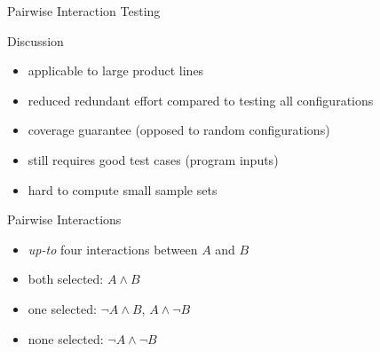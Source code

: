 \begin{frame}{\myframetitle}
\begin{mycolumns}
\begin{definition}{Pairwise Interaction Testing}
\begin{itemize}
			\end{itemize}
		\end{definition}
	\mynextcolumn
		\pause
		\begin{note}{Discussion}
			\begin{itemize}
				\setlength\itemsep{.4em}
				\item applicable to large product lines
				\item reduced redundant effort compared to testing all configurations
				\item coverage guarantee (opposed to random configurations)
				\item still requires good test cases (program inputs)
				\item hard to compute small sample sets
			\end{itemize}
		\end{note}
		\pause
		\begin{definition}{Pairwise Interactions}
			\begin{itemize}
				\setlength\itemsep{.5em}
				\item \emph{up-to} four interactions between $A$ and $B$
				\item both selected: $A \wedge B$
				\item one selected: $\neg A \wedge B$, $A \wedge \neg B$
				\item none selected: $\neg A \wedge \neg B$
			\end{itemize}
		\end{definition}
	\end{mycolumns}
\end{frame}

\newcommand{\pair}[2]{$#1 \wedge #2$ & $#1 \wedge \neg #2$ & $\neg #1 \wedge #2$ & $\neg #1 \wedge \neg #2$\\}
\newcommand{\redandgray}[1]{\only<#1-| handout:#1->{\color{black}}\only<#1| handout:#1>{\color{blue}}}
\newcommand{\epair}[6]{
	{\redandgray{#3}$#1 \wedge #2$} & 
	{\redandgray{#4}$#1 \wedge \neg #2$} & 
	{\redandgray{#5}$\neg #1 \wedge #2$} & 
	{\redandgray{#6}$\neg #1 \wedge \neg #2$}\\
}

